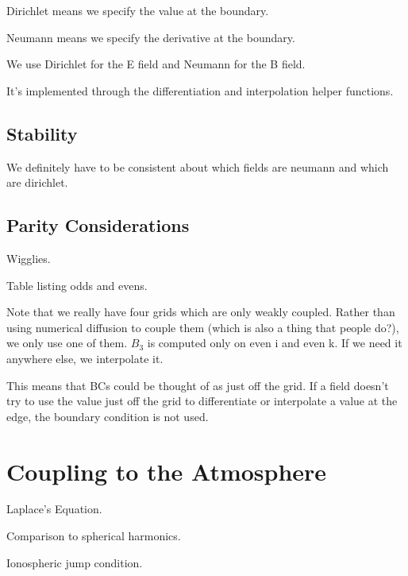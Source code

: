 Dirichlet means we specify the value at the boundary. 

Neumann means we specify the derivative at the boundary. 

We use Dirichlet for the E field and Neumann for the B field. 

It's implemented through the differentiation and interpolation helper functions. 

\subsection{Stability}

We definitely have to be consistent about which fields are neumann and which are dirichlet. 

\subsection{Parity Considerations}

Wigglies. 

Table listing odds and evens. 

Note that we really have four grids which are only weakly coupled. Rather than using numerical diffusion to couple them (which is also a thing that people do?), we only use one of them. $B_3$ is computed only on even i and even k. If we need it anywhere else, we interpolate it. 

This means that BCs could be thought of as just off the grid. If a field doesn't try to use the value just off the grid to differentiate or interpolate a value at the edge, the boundary condition is not used. 

\section{Coupling to the Atmosphere}

Laplace's Equation. 

Comparison to spherical harmonics. 

Ionospheric jump condition. 

